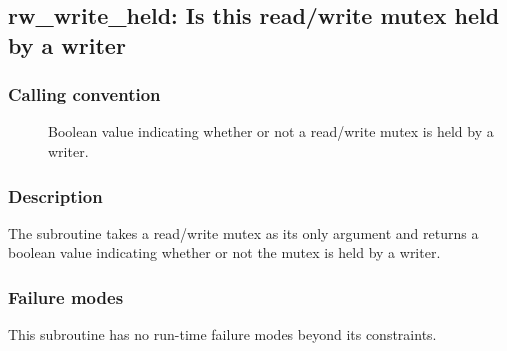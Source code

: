 \clearpage
{}
{}
\label{subr:rw-write-held}
\subsection*{rw\_write\_held: Is this read/write mutex held by a writer}

\subsubsection*{Calling convention}

\begin{description}
\item[] Boolean value indicating whether or not a
  read/write mutex is held by a writer.
\end{description}

\subsubsection*{Description}

The  subroutine takes a read/write mutex as
its only argument and returns a boolean value indicating whether or
not the mutex is held by a writer.

\subsubsection*{Failure modes}

This subroutine has no run-time failure modes beyond its constraints.
